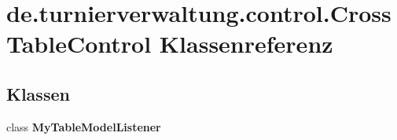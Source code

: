 \hypertarget{classde_1_1turnierverwaltung_1_1control_1_1_cross_table_control}{}\section{de.\+turnierverwaltung.\+control.\+Cross\+Table\+Control Klassenreferenz}
\label{classde_1_1turnierverwaltung_1_1control_1_1_cross_table_control}
\subsection*{Klassen}
\begin{DoxyCompactItemize}
\item 
class {\bfseries My\+Table\+Model\+Listener}
\end{DoxyCompactItemize}
